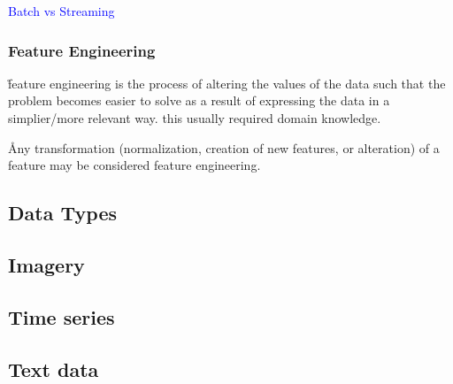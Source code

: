 \textcolor{blue}{Batch vs Streaming}


\subsubsection{Feature Engineering}

\r{feature engineering is the process of altering the values of the data such that the problem becomes easier to solve as a result of expressing the data in a simplier/more relevant way. this usually required domain knowledge.}

\r{Any transformation (normalization, creation of new features, or alteration) of a feature may be considered feature engineering.}





\subsection{Data Types}



\subsection{Imagery}

\subsection{Time series}


\subsection{Text data}
